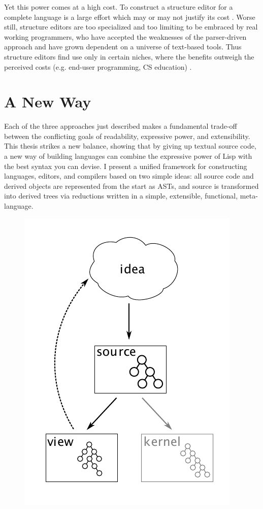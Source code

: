Yet this power comes at a high cost. To construct a structure editor for a complete language is a large effort which may or may not justify its cost \cite{lang}. Worse still, structure editors are too specialized and too limiting to be embraced by real working programmers, who have accepted the weaknesses of the parser-driven approach and have grown dependent on a universe of text-based tools. Thus structure editors find use only in certain niches, where the benefits outweigh the perceived costs (e.g. end-user programming, CS education) \cite{alice}.

%
%
\section{A New Way}

Each of the three approaches just described makes a fundamental trade-off between the conflicting goals of readability, expressive power, and extensibility. This thesis strikes a new balance, showing that by giving up textual source code, a new way of building languages can combine the expressive power of Lisp with the best syntax you can devise. I present a unified framework for constructing languages, editors, and compilers based on two simple ideas: all source code and derived objects are represented from the start as ASTs, and source is transformed into derived trees via reductions written in a simple, extensible, functional, meta-language.

\begin{figure}[th]
  \centering

  \includegraphics[scale=0.75]{src/image/figure2.pdf}

  \caption{\Meta}
  \label{fig-2}
\end{figure}

